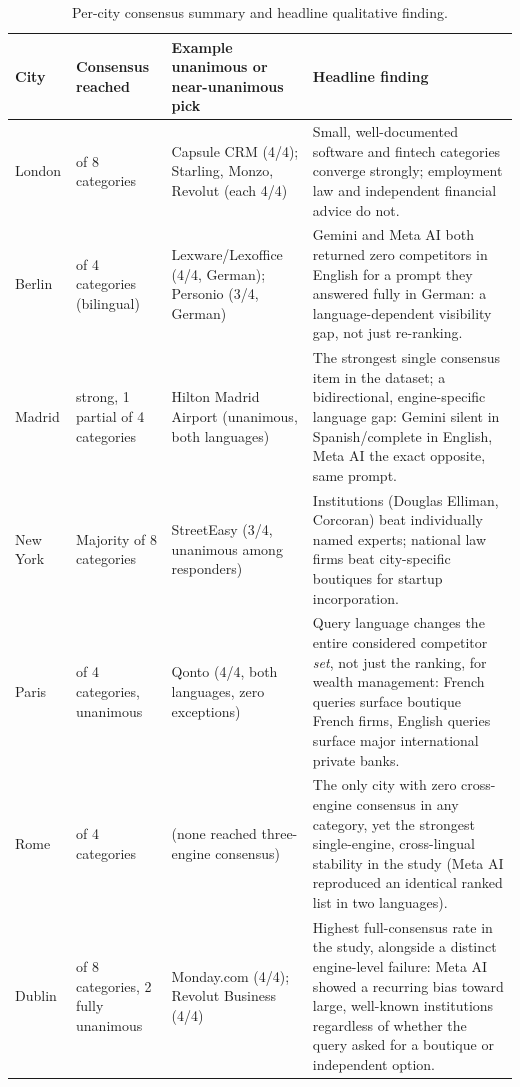 \documentclass[11pt]{article}
\begin{document}
\begin{table}[h]
\centering
\caption{Per-city consensus summary and headline qualitative finding.}
\label{tab:results}
\small
\begin{tabular}{>{\raggedright\arraybackslash}p{1.5cm}>{\raggedright\arraybackslash}p{2.3cm}>{\raggedright\arraybackslash}p{4.4cm}>{\raggedright\arraybackslash}p{5.4cm}}
\toprule
City & Consensus reached & Example unanimous or near-unanimous pick & Headline finding \\
\midrule
London & 6 of 8 categories & Capsule CRM (4/4); Starling, Monzo, Revolut (each 4/4) & Small, well-documented software and fintech categories converge strongly; employment law and independent financial advice do not. \\
Berlin & 2 of 4 categories (bilingual) & Lexware/Lexoffice (4/4, German); Personio (3/4, German) & Gemini and Meta AI both returned zero competitors in English for a prompt they answered fully in German: a language-dependent visibility gap, not just re-ranking. \\
Madrid & 1 strong, 1 partial of 4 categories & Hilton Madrid Airport (unanimous, both languages) & The strongest single consensus item in the dataset; a bidirectional, engine-specific language gap: Gemini silent in Spanish/complete in English, Meta AI the exact opposite, same prompt. \\
New York & Majority of 8 categories & StreetEasy (3/4, unanimous among responders) & Institutions (Douglas Elliman, Corcoran) beat individually named experts; national law firms beat city-specific boutiques for startup incorporation. \\
Paris & 1 of 4 categories, unanimous & Qonto (4/4, both languages, zero exceptions) & Query language changes the entire considered competitor \emph{set}, not just the ranking, for wealth management: French queries surface boutique French firms, English queries surface major international private banks. \\
Rome & 0 of 4 categories & (none reached three-engine consensus) & The only city with zero cross-engine consensus in any category, yet the strongest single-engine, cross-lingual stability in the study (Meta AI reproduced an identical ranked list in two languages). \\
Dublin & 5 of 8 categories, 2 fully unanimous & Monday.com (4/4); Revolut Business (4/4) & Highest full-consensus rate in the study, alongside a distinct engine-level failure: Meta AI showed a recurring bias toward large, well-known institutions regardless of whether the query asked for a boutique or independent option. \\
\bottomrule
\end{tabular}
\end{table}
\end{document}
